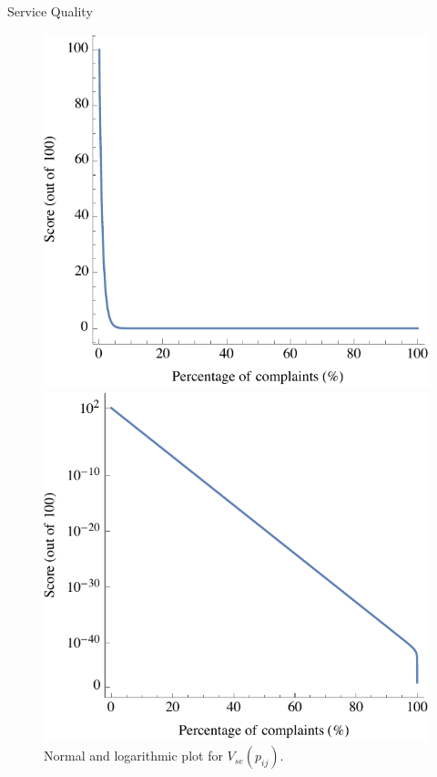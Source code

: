 \documentclass[8pt, hyperref={colorlinks=true}]{beamer}
\begin{document}
\begin{frame}{Service Quality}
\begin{figure}[htbp]
    \centering
    \begin{minipage}[t]{0.4\textwidth}
        \centering
        \includegraphics[scale=0.3]{service_plot.pdf}
    \end{minipage}
    \begin{minipage}[t]{0.4\textwidth}
        \centering
        \includegraphics[scale=0.3]{log_service_plot.pdf}
    \end{minipage}
    \caption{Normal and logarithmic plot for $V_{se}\left(p_{ij}\right).$}
    \label{fig:service_plot}
\end{figure}
\end{frame}
\end{document}
